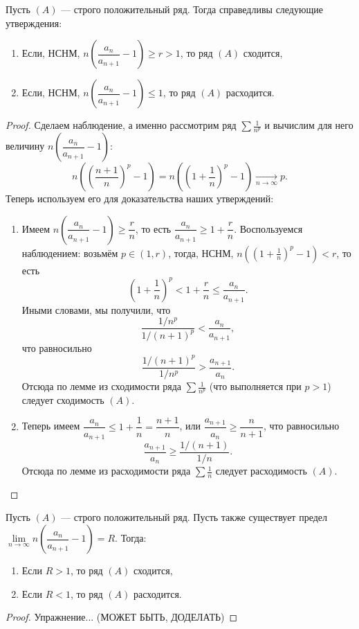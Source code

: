 \begin{theorem}[noob]
	Пусть \((A)\) --- строго положительный ряд. Тогда справедливы следующие утверждения:
	\begin{enumerate}
		\item Если, НСНМ, \(n \left(\dfrac{a_n}{a_{n+1}} - 1 \right) \geqslant r > 1\), то ряд \((A)\) сходится,
		\item Если, НСНМ, \(n \left(\dfrac{a_n}{a_{n+1}} - 1 \right) \leqslant 1\), то ряд \((A)\) расходится.
	\end{enumerate}
\end{theorem}
\begin{proof}
	Сделаем наблюдение, а именно рассмотрим ряд \(\sum \frac{1}{n^p}\) и вычислим для него величину \(n \left(\dfrac{a_n}{a_{n+1}} - 1 \right)\): \[
	n \left(\left(\frac{n + 1}{n} \right)^p - 1 \right) = n \left(\left(1 + \frac{1}{n}\right)^p - 1 \right) \xrightarrow[n \to \infty]{} p.
	\]
	Теперь используем его для доказательства наших утверждений:
	\begin{enumerate}
		\item Имеем \(n \left(\dfrac{a_n}{a_{n+1}} - 1 \right) \geqslant \dfrac{r}{n}\), то есть \(\dfrac{a_n}{a_{n+1}} \geqslant 1 + \dfrac{r}{n}\). Воспользуемся наблюдением: возьмём \(p \in (1, r)\), тогда, НСНМ, \(n \left(\left(1 + \frac{1}{n}\right)^p - 1 \right) < r\), то есть \[
			\left(1 + \frac{1}{n}\right)^p < 1 + \frac{r}{n} \leqslant \dfrac{a_n}{a_{n+1}}.
		\]
		Иными словами, мы получили, что  \[
			\frac{1/n^p}{1/(n + 1)^p} < \frac{a_n}{a_{n+1}},
		\]
		что равносильно \[
			\frac{1/(n + 1)^p}{1/n^p} > \frac{a_{n+1}}{a_n}.
		\]
		Отсюда по лемме из сходимости ряда \(\sum \frac{1}{n^p}\) (что выполняется при \(p > 1\)) следует сходимость \((A)\).
		\item Теперь имеем \(\dfrac{a_n}{a_{n+1}} \leqslant 1 + \dfrac{1}{n} = \dfrac{n + 1}{n}\), или \(\dfrac{a_{n+1}}{a_n} \geqslant \dfrac{n}{n + 1}\), что равносильно \[
			\frac{a_{n+1}}{a_n} \geqslant \frac{1/(n + 1)}{1/n}.
		\]
		Отсюда по лемме из расходимости ряда \(\sum \frac{1}{n}\) следует расходимость \((A)\).
	\end{enumerate}
\end{proof}

\begin{corollary}
	Пусть \((A)\) --- строго положительный ряд. Пусть также существует предел \(\lim\limits_{n \to \infty} n \left(\dfrac{a_n}{a_{n+1}} - 1 \right) = R\). Тогда:
	\begin{enumerate}
		\item Если \(R > 1\), то ряд \((A)\) сходится,
		\item Если \(R < 1\), то ряд \((A)\) расходится.
	\end{enumerate}
\end{corollary}
\begin{proof}
	Упражнение... (МОЖЕТ БЫТЬ,  ДОДЕЛАТЬ)
\end{proof}

